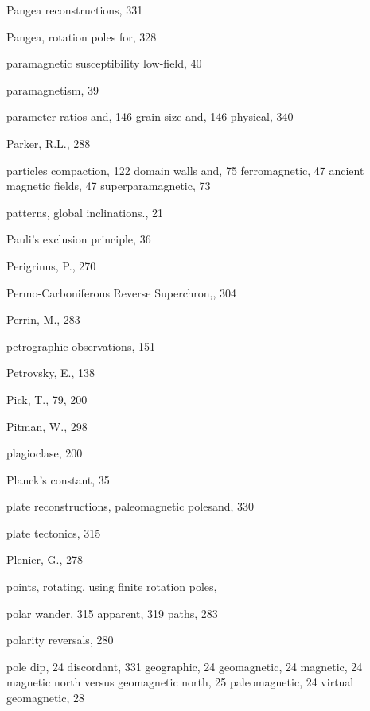 \documentclass[,plain]{tauxe}
\begin{document}
\begin{theindex}
  \item Pangea reconstructions, 331
 \item Pangea, rotation poles for, 328
  \item paramagnetic susceptibility
    \subitem low-field, 40
  \item paramagnetism, 39
  \item parameter
    \subitem ratios and, 146
    \subitem grain size and, 146
    \subitem physical, 340
  \item Parker, R.L., 288
  \item particles
    \subitem compaction, 122
    \subitem domain walls and, 75
    \subitem ferromagnetic, 47
      \subsubitem ancient magnetic fields, 47
    \subitem superparamagnetic, 73
  \item patterns, global inclinations., 21
  \item Pauli's exclusion principle, 36
  \item Perigrinus, P., 270
  \item Permo-Carboniferous Reverse Superchron,, 304
  \item Perrin, M., 283
  \item petrographic observations, 151
  \item Petrovsky, E., 138
  \item Pick, T., 79, 200
  \item Pitman, W., 298
  \item plagioclase, 200
  \item Planck's constant, 35
  \item plate reconstructions, paleomagnetic poles\break and, 330
  \item plate tectonics, 315
  \item Plenier, G., 278
  \item points, rotating, using finite rotation poles,
  \item polar wander, 315
	\subitem  apparent, 319
	\subitem  paths, 283
  \item polarity reversals, 280
  \item pole
    \subitem dip, 24
	\subitem discordant, 331 
	\subitem geographic, 24
    \subitem geomagnetic, 24
    \subitem magnetic, 24
    \subitem magnetic north versus geomagnetic north, 25
    \subitem paleomagnetic, 24
    \subitem virtual geomagnetic, 28
  

\end{theindex}
\end{document}
